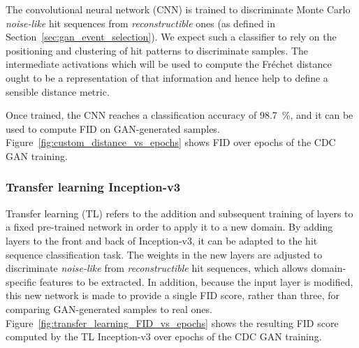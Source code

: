 The convolutional neural network (CNN) is trained to discriminate Monte Carlo
\emph{noise-like} hit sequences from \emph{reconstructible} ones (as defined in
Section~\ref{sec:gan_event_selection}). We expect such a classifier to rely on
the positioning and clustering of hit patterns to discriminate samples. The
intermediate activations which will be used to compute the Fréchet distance
ought to be a representation of that information and hence help to define a
sensible distance metric.

Once trained, the CNN reaches a classification accuracy of \SI{98.7}{\percent},
and it can be used to compute FID on GAN-generated samples.
Figure~\ref{fig:custom_distance_vs_epochs} shows FID over epochs of the CDC GAN
training.


\subsubsection{Transfer learning Inception-v3}

Transfer learning (TL) refers to the addition and subsequent training of layers
to a fixed pre-trained network in order to apply it to a new domain. By adding
layers to the front and back of Inception-v3, it can be adapted to the hit
sequence classification task. The weights in the new layers are adjusted to
discriminate \emph{noise-like} from \emph{reconstructible} hit sequences, which
allows domain-specific features to be extracted. In addition, because the input
layer is modified, this new network is made to provide a single FID score,
rather than three, for comparing GAN-generated samples to real ones.
Figure~\ref{fig:transfer_learning_FID_vs_epochs} shows the resulting FID score
computed by the TL Inception-v3 over epochs of the CDC GAN training.

